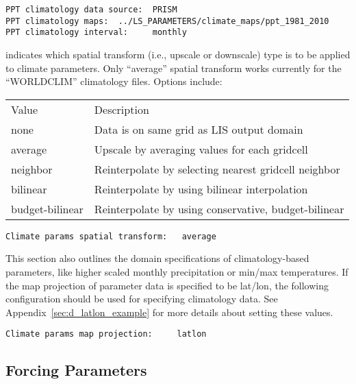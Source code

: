  \begin{Verbatim}[frame=single]
PPT climatology data source:  PRISM
PPT climatology maps:  ../LS_PARAMETERS/climate_maps/ppt_1981_2010
PPT climatology interval:     monthly
 \end{Verbatim}


 
  indicates which spatial
 transform (i.e., upscale or downscale) type is to be applied to
 climate parameters. Only ``average'' spatial transform works currently
 for the ``WORLDCLIM'' climatology files.
 Options include:

 \begin{tabular}{ll}
 Value   & Description                                   \\
 none    & Data is on same grid as LIS output domain     \\
 average   & Upscale by averaging values for each gridcell       \\
 neighbor  & Reinterpolate by selecting nearest gridcell neighbor \\
 bilinear  & Reinterpolate by using bilinear interpolation        \\
 budget-bilinear & Reinterpolate by using conservative, budget-bilinear \\
 \end{tabular}
 

 \begin{Verbatim}[frame=single]
Climate params spatial transform:   average
 \end{Verbatim}

 
 This section also outlines the domain specifications of
 climatology-based parameters, like higher scaled monthly
 precipitation or min/max temperatures.
 If the map projection of parameter data is specified to be lat/lon,
 the following configuration should be used for specifying
 climatology data.
 See Appendix~\ref{sec:d_latlon_example} for more details about
 setting these values.
 

 \begin{Verbatim}[frame=single]
Climate params map projection:     latlon
 \end{Verbatim}



 
 \subsection{Forcing Parameters} \label{ssec:forcings}
 

